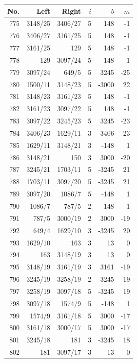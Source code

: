 \documentclass[11pt,a4paper]{article}
\begin{document}
\noindent\begin{minipage}[t]{.49\linewidth}\centering\footnotesize\setlength{\tabcolsep}{2pt}\renewcommand{\arraystretch}{1.09}
\begin{tabular*}{\linewidth}{@{}r@{\extracolsep{\fill}}rrrrr@{}}\toprule
No. & Left & Right & $i$ & $b$ & $m$\\\midrule
775 & 3148/25 & 3406/27 & 5 & 148 & -1\\
776 & 3406/27 & 3161/25 & 5 & 148 & -1\\
777 & 3161/25 & 129 & 5 & 148 & -1\\
778 & 129 & 3097/24 & 5 & 148 & -1\\
779 & 3097/24 & 649/5 & 5 & 3245 & -25\\
780 & 1500/11 & 3148/23 & 5 & -3000 & 22\\
781 & 3148/23 & 3161/23 & 5 & 148 & -1\\
782 & 3161/23 & 3097/22 & 5 & 148 & -1\\
783 & 3097/22 & 3245/23 & 5 & 3245 & -23\\
784 & 3406/23 & 1629/11 & 3 & -3406 & 23\\
785 & 1629/11 & 3148/21 & 3 & -148 & 1\\
786 & 3148/21 & 150 & 3 & 3000 & -20\\
787 & 3245/21 & 1703/11 & 5 & -3245 & 21\\
788 & 1703/11 & 3097/20 & 5 & -3245 & 21\\
789 & 3097/20 & 1086/7 & 5 & -148 & 1\\
790 & 1086/7 & 787/5 & 2 & -148 & 1\\
791 & 787/5 & 3000/19 & 2 & 3000 & -19\\
792 & 649/4 & 1629/10 & 3 & -3245 & 20\\
793 & 1629/10 & 163 & 3 & 13 & 0\\
794 & 163 & 3148/19 & 3 & 13 & 0\\
795 & 3148/19 & 3161/19 & 3 & 3161 & -19\\
796 & 3245/19 & 3258/19 & 2 & -3245 & 19\\
797 & 3258/19 & 3097/18 & 5 & -3245 & 19\\
798 & 3097/18 & 1574/9 & 5 & -148 & 1\\
799 & 1574/9 & 3161/18 & 5 & 3000 & -17\\
800 & 3161/18 & 3000/17 & 5 & 3000 & -17\\
801 & 3245/18 & 181 & 3 & -3245 & 18\\
802 & 181 & 3097/17 & 3 & 13 & 0\\

\end{tabular*}
\end{minipage}
\end{document}
